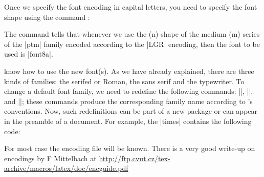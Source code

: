 \begin{multicols}{2}
\begin{teX}
\endinput

\end{teX}


Once we specify the font encoding in capital letters, you need to specify the font shape using the command :

\begin{teX}
\end{teX}

The command tells \latex that whenever we use the (n) shape of the medium (m) series of the |ptm| family encoded according to the |LGR| encoding, then the font to be used is |font8a|.

\latex know how to use the new font(s). As we have already explained, there are three
kinds of families: the serifed or Roman, the sans serif and the typewriter. To change a
default font family, we need to redefine the following commands: |\rmdefault|, |\sfdefault|,
and |\ttdefault|; these commands produce the corresponding family name
according to \latex's conventions. Now, such redefinitions can be part of a new package
or can appear in the preamble of a document. For example, the |times| contains
the following code:

\begin{teX}
\renewcommand{\sfdefault}{phv}
\renewcommand{\rmdefault}{ptm}
\renewcommand{\ttdefault}{pcr}
\end{teX}


For most case the encoding file will be known. There is a very good write-up on encodings by F Mittelbach at 
\url{http://ftp.cvut.cz/tex-archive/macros/latex/doc/encguide.pdf}

\end{multicols}
